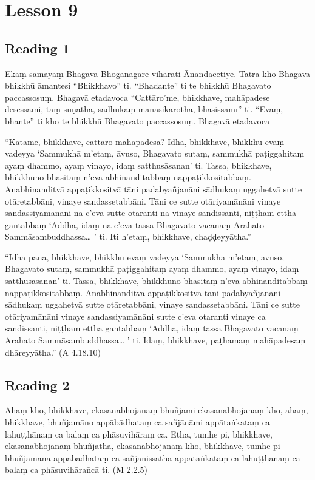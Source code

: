 \chapter{Lesson 9}

\section*{Reading 1}

Ekaṃ samayaṃ Bhagavā Bhoganagare viharati Ānandacetiye. Tatra kho Bhagavā bhikkhū āmantesi “Bhikkhavo” ti. “Bhadante” ti te bhikkhū Bhagavato paccassosuṃ. Bhagavā etadavoca “Cattāro’me, bhikkhave, mahāpadese desessāmi, taṃ suṇātha, sādhukaṃ manasikarotha, bhāsissāmī” ti. “Evaṃ, bhante” ti kho te bhikkhū Bhagavato paccassosuṃ. Bhagavā etadavoca

“Katame, bhikkhave, cattāro mahāpadesā? Idha, bhikkhave, bhikkhu evaṃ vadeyya ‘Sammukhā m’etaṃ, āvuso, Bhagavato sutaṃ, sammukhā paṭiggahitaṃ ayaṃ dhammo, ayaṃ vinayo, idaṃ satthusāsanan’ ti. Tassa, bhikkhave, bhikkhuno bhāsitaṃ n’eva abhinanditabbaṃ nappaṭikkositabbaṃ. Anabhinanditvā appaṭikkositvā tāni padabyañjanāni sādhukaṃ uggahetvā sutte otāretabbāni, vinaye sandassetabbāni. Tāni ce sutte otāriyamānāni vinaye sandassiyamānāni na c’eva sutte otaranti na vinaye sandissanti, niṭṭham ettha gantabbaṃ ‘Addhā, idaṃ na c’eva tassa Bhagavato vacanaṃ Arahato Sammāsambuddhassa… ’ ti. Iti h’etaṃ, bhikkhave, chaḍḍeyyātha.”

“Idha pana, bhikkhave, bhikkhu evaṃ vadeyya ‘Sammukhā m’etaṃ, āvuso, Bhagavato sutaṃ, sammukhā paṭiggahitaṃ ayaṃ dhammo, ayaṃ vinayo, idaṃ satthusāsanan’ ti. Tassa, bhikkhave, bhikkhuno bhāsitaṃ n’eva abhinanditabbaṃ nappaṭikkositabbaṃ. Anabhinanditvā appaṭikkositvā tāni padabyañjanāni sādhukaṃ uggahetvā sutte otāretabbāni, vinaye sandassetabbāni. Tāni ce sutte otāriyamānāni vinaye sandassiyamānāni sutte c’eva otaranti vinaye ca sandissanti, niṭṭham ettha gantabbaṃ ‘Addhā, idaṃ tassa Bhagavato vacanaṃ Arahato Sammāsambuddhassa… ’ ti. Idaṃ, bhikkhave, paṭhamaṃ mahāpadesaṃ dhāreyyātha.” (A 4.18.10)

\section*{Reading 2}

Ahaṃ kho, bhikkhave, ekāsanabhojanaṃ bhuñjāmi ekāsanabhojanaṃ kho, ahaṃ, bhikkhave, bhuñjamāno appābādhataṃ ca sañjānāmi appātaṅkataṃ ca lahuṭṭhānaṃ ca balaṃ ca phāsuvihāraṃ ca. Etha, tumhe pi, bhikkhave, ekāsanabhojanaṃ bhuñjatha, ekāsanabhojanaṃ kho, bhikkhave, tumhe pi bhuñjamānā appābādhataṃ ca sañjānissatha appātaṅkataṃ ca lahuṭṭhānaṃ ca balaṃ ca phāsuvihārañcā ti. (M 2.2.5)

